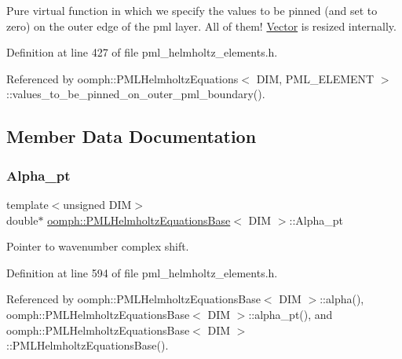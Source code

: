 Pure virtual function in which we specify the values to be pinned (and set to zero) on the outer edge of the pml layer. All of them! \hyperlink{classoomph_1_1Vector}{Vector} is resized internally. 



Definition at line 427 of file pml\+\_\+helmholtz\+\_\+elements.\+h.



Referenced by oomph\+::\+P\+M\+L\+Helmholtz\+Equations$<$ D\+I\+M, P\+M\+L\+\_\+\+E\+L\+E\+M\+E\+N\+T $>$\+::values\+\_\+to\+\_\+be\+\_\+pinned\+\_\+on\+\_\+outer\+\_\+pml\+\_\+boundary().



\subsection{Member Data Documentation}
\mbox{\label{classoomph_1_1PMLHelmholtzEquationsBase_a8edfd5d6b057ee97e9b95001c59dfa78}} 
\subsubsection{\texorpdfstring{Alpha\+\_\+pt}{Alpha\_pt}}
{\footnotesize\ttfamily template$<$unsigned D\+IM$>$ \\
double$\ast$ \hyperlink{classoomph_1_1PMLHelmholtzEquationsBase}{oomph\+::\+P\+M\+L\+Helmholtz\+Equations\+Base}$<$ D\+IM $>$\+::Alpha\+\_\+pt\hspace{0.3cm}{\ttfamily [protected]}}



Pointer to wavenumber complex shift. 



Definition at line 594 of file pml\+\_\+helmholtz\+\_\+elements.\+h.



Referenced by oomph\+::\+P\+M\+L\+Helmholtz\+Equations\+Base$<$ D\+I\+M $>$\+::alpha(), oomph\+::\+P\+M\+L\+Helmholtz\+Equations\+Base$<$ D\+I\+M $>$\+::alpha\+\_\+pt(), and oomph\+::\+P\+M\+L\+Helmholtz\+Equations\+Base$<$ D\+I\+M $>$\+::\+P\+M\+L\+Helmholtz\+Equations\+Base().

\mbox{\label{classoomph_1_1PMLHelmholtzEquationsBase_a2a970f3f95953bd1c7978733201437a8}} 
